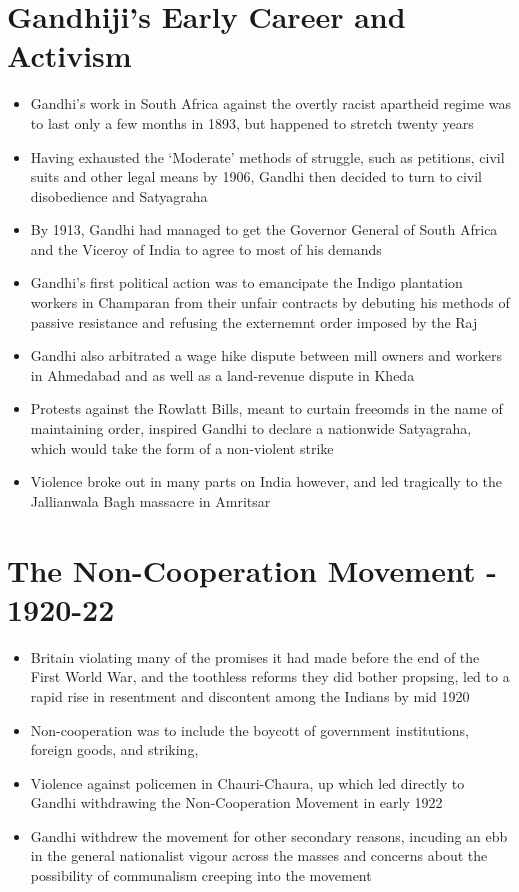 \section{Gandhiji’s Early Career and Activism}
\begin{itemize}
    \item Gandhi's work in South Africa against the overtly racist apartheid regime was to last only a few months in 1893, but happened to stretch twenty years
    \item Having exhausted the `Moderate' methods of struggle, such as petitions, civil suits and other legal means by 1906, Gandhi then decided to turn to civil disobedience and Satyagraha
    \item By 1913, Gandhi had managed to get the Governor General of South Africa and the Viceroy of India to agree to most of his demands
    \item Gandhi's first political action was to emancipate the Indigo plantation workers in Champaran from their unfair contracts by debuting his methods of passive resistance and refusing the externemnt order imposed by the Raj
    \item Gandhi also arbitrated a wage hike dispute between mill owners and workers in Ahmedabad and as well as a land-revenue dispute in Kheda
    \item Protests against the Rowlatt Bills, meant to curtain freeomds in the name of maintaining order, inspired Gandhi to declare a nationwide Satyagraha, which would take the form of a non-violent strike
    \item Violence broke out in many parts on India however, and led tragically to the Jallianwala Bagh massacre in Amritsar
\end{itemize}

\section{The Non-Cooperation Movement - 1920-22}
\begin{itemize}
    \item Britain violating many of the promises it had made before the end of the First World War, and the toothless reforms they did bother propsing, led to a rapid rise in resentment and discontent among the Indians by mid 1920
    \item Non-cooperation was to include the boycott of government institutions, foreign goods, and striking,
    \item Violence against policemen in Chauri-Chaura, \acrshort{up} which led directly to Gandhi withdrawing the Non-Cooperation Movement in early 1922
    \item Gandhi withdrew the movement for other secondary reasons, incuding an ebb in the general nationalist vigour across the masses and concerns about the possibility of communalism creeping into the movement
\end{itemize}

